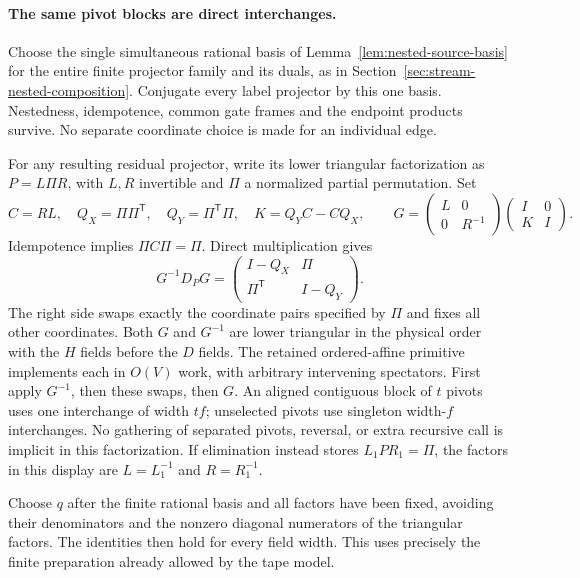 \paragraph{The same pivot blocks are direct interchanges.}
Choose the single simultaneous rational basis of
Lemma~\ref{lem:nested-source-basis} for the entire finite projector
family and its duals, as in Section~\ref{sec:stream-nested-composition}.
Conjugate every label projector by this one basis. Nestedness,
idempotence, common gate frames and the endpoint products survive.
No separate coordinate choice is made for an individual edge.

For any resulting residual projector, write its lower triangular
factorization as $P=L\Pi R$, with $L,R$ invertible and $\Pi$ a normalized
partial permutation. Set
\[
 C=RL,\quad Q_X=\Pi\Pi^{\mathsf T},\quad
 Q_Y=\Pi^{\mathsf T}\Pi,\quad K=Q_YC-CQ_X,
 \qquad
 G=\begin{pmatrix}L&0\\0&R^{-1}\end{pmatrix}
   \begin{pmatrix}I&0\\K&I\end{pmatrix}.
\]
Idempotence implies $\Pi C\Pi=\Pi$. Direct multiplication gives
\[
 G^{-1}D_PG=
 \begin{pmatrix}I-Q_X&\Pi\\\Pi^{\mathsf T}&I-Q_Y\end{pmatrix}.
\]
The right side swaps exactly the coordinate pairs specified by $\Pi$
and fixes all other coordinates. Both $G$ and $G^{-1}$ are lower
triangular in the physical order with the $H$ fields before the $D$
fields. The retained ordered-affine primitive implements each in
$O(V)$ work, with arbitrary intervening spectators. First apply
$G^{-1}$, then these swaps, then $G$. An aligned contiguous block of
$t$ pivots uses one interchange of width $tf$; unselected pivots use
singleton width-$f$ interchanges. No gathering of separated pivots,
reversal, or extra recursive call is implicit in this factorization.
If elimination instead stores $L_1PR_1=\Pi$, the factors in this
display are $L=L_1^{-1}$ and $R=R_1^{-1}$.

Choose $q$ after the finite rational basis and all factors have been
fixed, avoiding their denominators and the nonzero diagonal numerators
of the triangular factors. The identities then hold for every field
width. This uses precisely the finite preparation already allowed by
the tape model.

